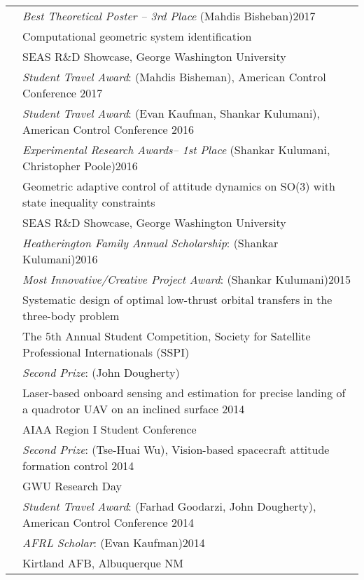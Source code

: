 \documentclass[10pt]{article}
\begin{document}
\begin{tabularx}{\textwidth}{>{\setlength{\hsize}{0.5cm}}X X}
& \textit{Best Theoretical Poster -- 3rd Place} (Mahdis Bisheban)\hfill 2017\\
& Computational geometric system identification\\
& SEAS R\&D Showcase, George Washington University\\[0.2cm]


& \textit{Student Travel Award}: (Mahdis Bisheman), {American Control Conference} \hfill 2017
\\[0.2cm]


& \textit{Student Travel Award}: (Evan Kaufman, Shankar Kulumani), {American Control Conference} \hfill 2016
\\[0.2cm]


& \textit{Experimental Research Awards-- 1st Place} (Shankar Kulumani, Christopher Poole)\hfill 2016\\
& Geometric adaptive control of attitude dynamics on SO(3) with state inequality constraints\\
& SEAS R\&D Showcase, George Washington University\\[0.2cm]


& \textit{Heatherington Family Annual Scholarship}: (Shankar Kulumani)\hfill 2016\\[0.2cm]

& \textit{Most Innovative/Creative Project Award}: (Shankar Kulumani)\hfill 2015\\
& {Systematic design of optimal low-thrust orbital transfers in the three-body problem}\\
& The 5th Annual Student Competition, Society for Satellite Professional Internationals (SSPI)\\[0.2cm]

& \textit{Second Prize}: (John Dougherty)\\
& {Laser-based onboard sensing and estimation for precise landing of a quadrotor UAV on an inclined surface} \hfill 2014\\
& AIAA Region I Student Conference\\[0.2cm]

& \textit{Second Prize}: (Tse-Huai Wu), {Vision-based spacecraft attitude formation control} \hfill 2014\\
& GWU Research Day\\[0.2cm]

& \textit{Student Travel Award}: (Farhad Goodarzi, John Dougherty), {American Control Conference} \hfill 2014\\[0.2cm]

& \textit{AFRL Scholar}: (Evan Kaufman)\hfill 2014\\
& Kirtland AFB, Albuquerque NM\\[0.2cm]


\end{tabularx}
\end{document}
